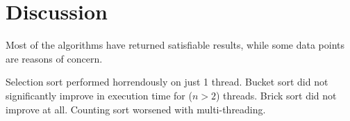 \chapter{Discussion}

Most of the algorithms have returned satisfiable results, while
some data points are reasons of concern.

Selection sort performed horrendously on just 1 thread.
Bucket sort did not significantly improve in execution time for ($n > 2$) threads.
Brick sort did not improve at all.
Counting sort worsened with multi-threading.